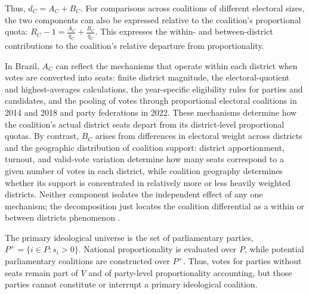 \documentclass[11pt]{article}
\begin{document}
Thus, \(d_C=A_C+B_C\). For comparisons across coalitions of different electoral
sizes, the two components can also be expressed relative to the coalition's
proportional quota: \(R_C-1=\frac{A_C}{q_C}+\frac{B_C}{q_C}.\) This expresses
the within- and between-district contributions to the coalition's relative
departure from proportionality.

In Brazil, \(A_C\) can reflect the mechanisms that operate within each district
when votes are converted into seats: finite district magnitude, the
electoral-quotient and highest-averages calculations, the year-specific
eligibility rules for parties and candidates, and the pooling of votes through
proportional electoral coalitions in 2014 and 2018 and party federations in
2022. These mechanisms determine how the coalition's actual district seats
depart from its district-level proportional quotas. By contrast, \(B_C\) arises
from differences in electoral weight across districts and the geographic
distribution of coalition support: district apportionment, turnout, and
valid-vote variation determine how many seats correspond to a given number of
votes in each district, while coalition geography determines whether its support
is concentrated in relatively more or less heavily weighted districts. Neither
component isolates the independent effect of any one mechanism; the
decomposition just locates the coalition differential as a within or between
districts phenomenon \parencite{bochsler2026winners}.


The primary ideological universe is the set of parliamentary parties,
\(P^+=\{i\in P:s_i>0\}.\) National proportionality is evaluated over \(P\),
while potential parliamentary coalitions are constructed over \(P^+\). Thus,
votes for parties without seats remain part of \(V\) and of party-level
proportionality accounting, but those parties cannot constitute or interrupt a
primary ideological coalition. 
\end{document}
